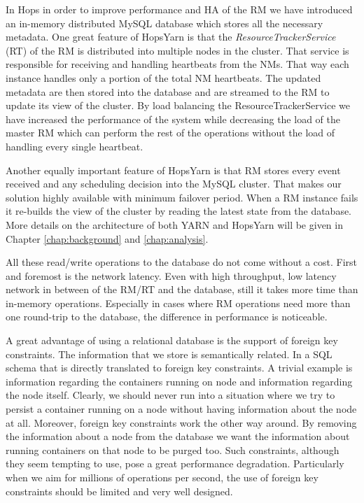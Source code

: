 In Hops in order to improve performance and HA of the RM we have introduced an
in-memory distributed MySQL database which stores all the necessary
metadata. One great feature of HopsYarn is that the
\emph{ResourceTrackerService} (RT) of the RM is distributed into multiple
nodes in the cluster. That service is responsible for receiving and handling
heartbeats from the NMs. That way each instance handles only a portion of the total NM
heartbeats. The updated metadata are then stored into the database and
are streamed to the RM to update its view of the cluster. By load
balancing the ResourceTrackerService we have increased the performance
of the system while decreasing the load of the master RM which can
perform the rest of the operations without the load of handling every
single heartbeat.

Another equally important feature of HopsYarn is that RM stores
every event received and any scheduling decision into the MySQL
cluster. That makes our solution highly available with minimum
failover period. When a RM instance fails it re-builds the view of the
cluster by reading the latest state from the database. More details on
the architecture of both YARN and HopsYarn will be given in Chapter
\ref{chap:background} and \ref{chap:analysis}.

All these read/write operations to the database do not come without
a cost. First and foremost is the network latency. Even with high
throughput, low latency network in between of the RM/RT and the database, still
it takes more time than in-memory operations. Especially in cases
where RM operations need more than one round-trip to the database, the
difference in performance is noticeable.

A great advantage of using a relational database is the support of
foreign key constraints. The information that we store is semantically
related. In a SQL schema that is directly translated to foreign key
constraints. A trivial example is information regarding the containers
running on node and information regarding the node itself. Clearly, we
should never run into a situation where we try to persist a container
running on a node without having information about the node at
all. Moreover, foreign key constraints work the other way around. By
removing the information about a node from the database we want the
information about running containers on that node to be purged
too. Such constraints, although they seem tempting to use, pose a
great performance degradation. Particularly when we aim for millions
of operations per second, the use of foreign key constraints should be
limited and very well designed.